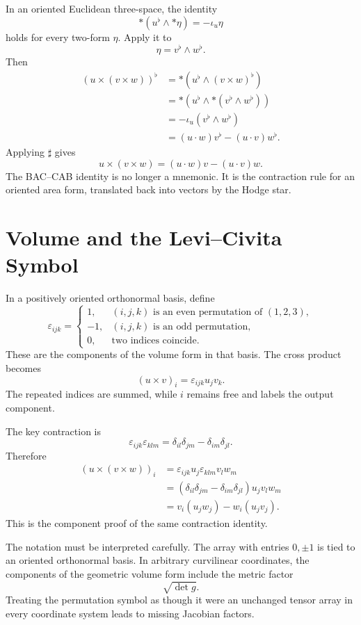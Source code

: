 In an oriented Euclidean three-space, the identity
\[
  *(u^{\flat}\wedge *\eta)
  =-\iota_u\eta
\]
holds for every two-form \(\eta\).  Apply it to
\[
  \eta=v^{\flat}\wedge w^{\flat}.
\]
Then
\[
\begin{aligned}
  (u\times(v\times w))^{\flat}
  &=*\left(u^{\flat}\wedge(v\times w)^{\flat}\right)\\
  &=*\left(u^{\flat}\wedge*(v^{\flat}\wedge w^{\flat})\right)\\
  &=-\iota_u(v^{\flat}\wedge w^{\flat})\\
  &=(u\cdot w)v^{\flat}-(u\cdot v)w^{\flat}.
\end{aligned}
\]
Applying \(\sharp\) gives
\[
  \boxed{
  u\times(v\times w)
  =(u\cdot w)v-(u\cdot v)w.}
\]
The BAC--CAB identity is no longer a mnemonic.  It is the contraction rule for an oriented area form, translated back into vectors by the Hodge star.

\section{Volume and the Levi--Civita Symbol}

In a positively oriented orthonormal basis, define
\[
  \varepsilon_{ijk}
  =
  \begin{cases}
    1,&(i,j,k)\text{ is an even permutation of }(1,2,3),\\
    -1,&(i,j,k)\text{ is an odd permutation},\\
    0,&\text{two indices coincide}.
  \end{cases}
\]
These are the components of the volume form in that basis.  The cross product becomes
\[
  (u\times v)_i
  =\varepsilon_{ijk}u_jv_k.
\]
The repeated indices are summed, while \(i\) remains free and labels the output component.

The key contraction is
\[
  \varepsilon_{ijk}\varepsilon_{klm}
  =\delta_{il}\delta_{jm}-\delta_{im}\delta_{jl}.
\]
Therefore
\[
\begin{aligned}
  (u\times(v\times w))_i
  &=\varepsilon_{ijk}u_j
    \varepsilon_{klm}v_lw_m\\
  &=(\delta_{il}\delta_{jm}-\delta_{im}\delta_{jl})
    u_jv_lw_m\\
  &=v_i(u_jw_j)-w_i(u_jv_j).
\end{aligned}
\]
This is the component proof of the same contraction identity.

The notation must be interpreted carefully.  The array with entries \(0,\pm1\) is tied to an oriented orthonormal basis.  In arbitrary curvilinear coordinates, the components of the geometric volume form include the metric factor
\[
  \sqrt{\det g}.
\]
Treating the permutation symbol as though it were an unchanged tensor array in every coordinate system leads to missing Jacobian factors.

